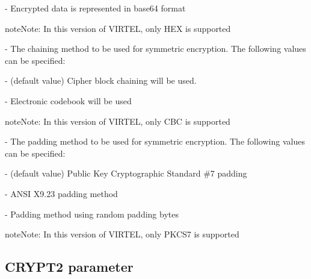 \documentclass[letterpaper,10pt,english]{sphinxmanual}
\begin{document}
 - Encrypted data is represented in base64 format

\begin{sphinxadmonition}{note}{Note:}
In this version of VIRTEL, only HEX is supported
\end{sphinxadmonition}

 - The chaining method to be used for symmetric encryption. The following values can be specified:

 - (default value) Cipher block chaining will be used.

 - Electronic codebook will be used

\begin{sphinxadmonition}{note}{Note:}
In this version of VIRTEL, only CBC is supported
\end{sphinxadmonition}

 - The padding method to be used for symmetric encryption. The following values can be specified:

 - (default value) Public Key Cryptographic Standard \#7 padding

 - ANSI X9.23 padding method

 - Padding method using random padding bytes

\begin{sphinxadmonition}{note}{Note:}
In this version of VIRTEL, only PKCS7 is supported
\end{sphinxadmonition}


\subsection{CRYPT2 parameter}
\label{\detokenize{Installation_Guide:crypt2-parameter}}\label{\detokenize{Installation_Guide:index-49}}
\begin{sphinxVerbatim}[commandchars=\\\{\}]
\PYG{p}{[}\PYG{p}{]}\PYG{p}{[}\PYG{p}{]}\PYG{p}{[}\PYG{p}{]}\PYG{p}{[}\PYG{p}{]}\PYG{p}{[}\PYG{p}{]}\PYG{p}{[}\PYG{p}{]}
\end{sphinxVerbatim}
\end{document}
